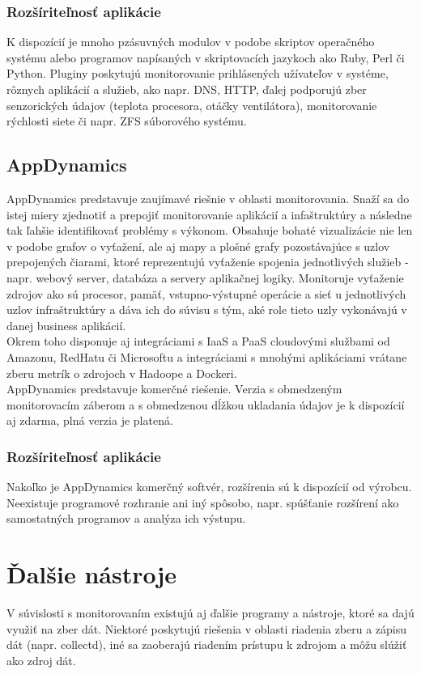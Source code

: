\documentclass[12pt,twoside,color,cover,table]{fithesis3}
\begin{document}
\subsubsection{Rozšíriteľnosť aplikácie}
K dispozícií je mnoho pzásuvných modulov v podobe skriptov operačného systému alebo programov napísaných v skriptovacích jazykoch ako Ruby,
Perl či Python. Pluginy poskytujú monitorovanie prihlásených užívateľov v systéme, rôznych aplikácií a služieb, ako napr. DNS, HTTP, ďalej
podporujú zber senzorických údajov (teplota procesora, otáčky ventilátora), monitorovanie rýchlosti siete či napr. ZFS súborového systému.

\subsection{AppDynamics}
AppDynamics predstavuje zaujímavé riešnie v oblasti monitorovania. Snaží sa do istej miery zjednotiť a prepojiť monitorovanie aplikácií 
a infaštruktúry a následne tak ľahšie identifikovať problémy s výkonom. Obsahuje bohaté vizualizácie nie len v podobe grafov o vyťažení,
ale aj mapy a plošné grafy pozostávajúce s uzlov prepojených čiarami, ktoré reprezentujú vyťaženie spojenia jednotlivých služieb - 
napr. webový server, databáza a servery aplikačnej logiky. Monitoruje vyťaženie zdrojov ako sú procesor, pamäť, vstupno-výstupné operácie
a sieť u jednotlivých uzlov infraštruktúry a dáva ich do súvisu s tým, aké role tieto uzly vykonávajú v danej business aplikácií.
\\Okrem toho disponuje aj integráciami s IaaS a PaaS cloudovými službami od Amazonu, RedHatu či Microsoftu a integráciami s mnohými aplikáciami
vrátane zberu metrík o zdrojoch v Hadoope a Dockeri.%
\\AppDynamics predstavuje komerčné riešenie. Verzia s obmedzeným monitorovacím záberom a s obmedzenou dĺžkou ukladania údajov je k 
dispozícií aj zdarma, plná verzia je platená.

\subsubsection{Rozšíriteľnosť aplikácie}
Nakoľko je AppDynamics komerčný softvér, rozšírenia sú k dispozícií od výrobcu. Neexistuje programové rozhranie ani iný spôsobo, napr. spúšťanie rozšírení ako samostatných programov a analýza 
ich výstupu.

\section{Ďalšie nástroje}
V súvislosti s monitorovaním existujú aj ďalšie programy a nástroje, ktoré sa dajú využiť na zber dát. Niektoré poskytujú riešenia v oblasti riadenia zberu a zápisu dát (napr. collectd), iné
sa zaoberajú riadením prístupu k zdrojom a môžu slúžiť ako zdroj dát.
\end{document}
